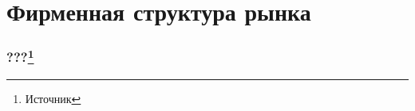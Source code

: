 \section{Фирменная структура рынка}

\begin{frame}
    \frametitle{???\footnote{Источник}}
\end{frame}